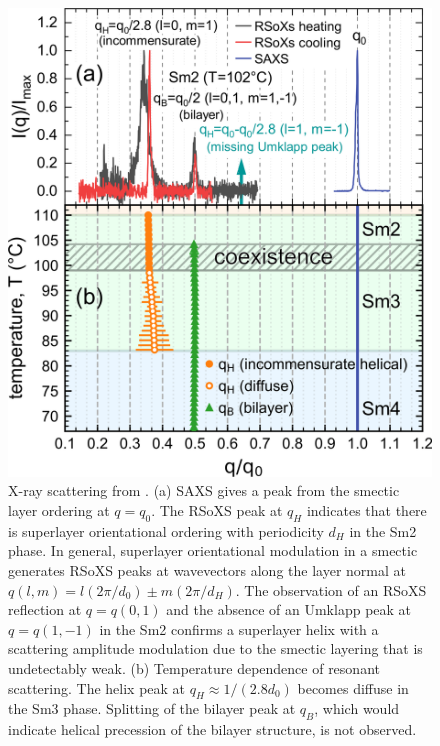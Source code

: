 \begin{figure}
    \includegraphics[width=\columnwidth]{./figs/pal30/finalFigs/xray-combined.png}
    \caption{\label{fig:xray-results}X-ray scattering from .
        (a) SAXS gives a peak from the smectic layer ordering at $q=q_0$.
        The RSoXS peak at $q_H$ indicates that there is superlayer orientational ordering with periodicity $d_H$
        in the Sm2 phase.
        In general, superlayer orientational modulation in a smectic generates RSoXS peaks at wavevectors along the layer normal at
        $q(l,m) = l(2\pi/d_0) \pm m(2\pi/d_H)$\cite{levelut1999tensorial}.  The
        observation of an RSoXS reflection at $q = q(0,1)$ and the absence of an Umklapp peak at $q = q(1,-1)$  in
        the Sm2 confirms a superlayer helix with a scattering amplitude
        modulation due to the smectic layering that is undetectably weak.
        (b) Temperature dependence of resonant scattering. The helix peak at $q_H \approx1/(2.8 d_0)$ becomes diffuse in the Sm3 phase. Splitting
        of the bilayer peak at $q_B$, which would indicate helical precession of the bilayer structure, is not observed.
        }
\end{figure}


